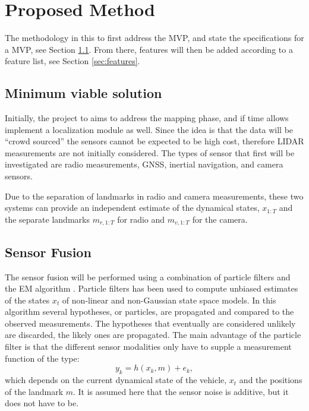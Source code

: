 \section{Proposed Method}

The methodology in this to first address the \gls{MVP}, and state the
specifications for a \gls{MVP}, see Section \ref{sec:mvs}. From there, features
will then be added
according to a feature list, see Section \ref{sec:features}.

\subsection{Minimum viable solution}\label{sec:mvs}

Initially, the project to aims to address the mapping phase, and if time allows
implement a localization module as well. Since the idea is that the data will
be ``crowd sourced'' the sensors cannot be expected to be high cost, therefore
\gls{LIDAR} measurements are not initially considered. The types of sensor that
first will be investigated are radio measurements, \gls{GNSS}, inertial
navigation, and camera sensors.

Due to the separation of landmarks in radio and camera measurements, these two
systems can provide an independent estimate of the dynamical states, $x_{1:T}$
and the separate landmarks $m_{r,1:T}$ for radio and $m_{v,1:T}$ for the
camera.

\subsection{Sensor Fusion}

The sensor fusion will be performed using a combination of particle
filters and the \gls{EM} algorithm
\cite{DBLP:journals/automatica/SchonWN11}. Particle filters
\cite{210672} has been used to compute unbiased estimates of the
states $x_{t}$  of non-linear and non-Gaussian state space models. In
this algorithm several hypotheses, or particles, are propagated and
compared to the observed measurements. The hypotheses that eventually
are considered unlikely are discarded, the likely ones are
propagated. The main advantage of the particle filter is that the
different sensor modalities only have to supple a measurement function
of the type:
$$
y_k = h(x_k, m) + e_k,
$$
which depends on the current dynamical state of the vehicle, $x_t$ and
the positions of the landmark $m$. It is assumed here that the sensor
noise is additive, but it does not have to be.

